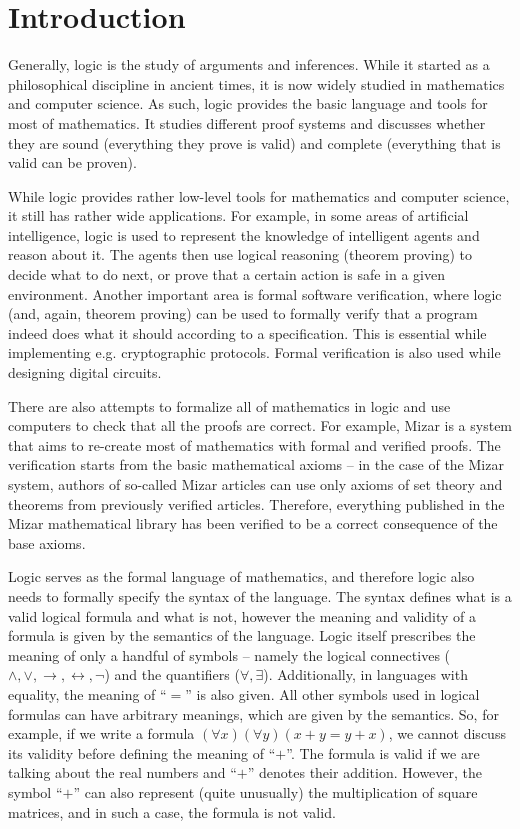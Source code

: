 
\chapter{Introduction}

Generally, logic is the study of arguments and inferences. While it started as a philosophical discipline in ancient times, it is now widely studied in mathematics and computer science. As such, logic provides the basic language and tools for most of mathematics. It studies different proof systems and discusses whether they are sound (everything they prove is valid) and complete (everything that is valid can be proven). 

While logic provides rather low-level tools for mathematics and computer science, it still has rather wide applications. For example, in some areas of artificial intelligence, logic is used to represent the knowledge of intelligent agents and reason about it. The agents then use logical reasoning (theorem proving) to decide what to do next, or prove that a certain action is safe in a given environment. Another important area is formal software verification, where logic (and, again, theorem proving) can be used to formally verify that a program indeed does what it should according to a specification. This is essential while implementing e.g. cryptographic protocols. Formal verification is also used while designing digital circuits.

There are also attempts to formalize all of mathematics in logic and use computers to check that all the proofs are correct. For example, Mizar is a system that aims to re-create most of mathematics with formal and verified proofs. The verification starts from the basic mathematical axioms -- in the case of the Mizar system, authors of so-called Mizar articles can use only axioms of set theory and theorems from previously verified articles. Therefore, everything published in the Mizar mathematical library has been verified to be a correct consequence of the base axioms.

Logic serves as the formal language of mathematics, and therefore logic also needs to formally specify the syntax of the language. The syntax defines what is a valid logical formula and what is not, however the meaning and validity of a formula is given by the semantics of the language. Logic itself prescribes the meaning of only a handful of symbols -- namely the logical connectives ($\land, \lor, \to, \leftrightarrow, \neg$) and the quantifiers ($\forall, \exists $). Additionally, in languages with equality, the meaning of ``$=$'' is also given. All other symbols used in logical formulas can have arbitrary meanings, which are given by the semantics. So, for example, if we write a formula $(\forall x)(\forall y)(x + y = y + x)$, we cannot discuss its validity before defining the meaning of ``$+$''. The formula is valid if we are talking about the real numbers and ``$+$'' denotes their addition.  However, the symbol ``$+$'' can also represent (quite unusually) the multiplication of square matrices, and in such a case, the formula is not valid.

